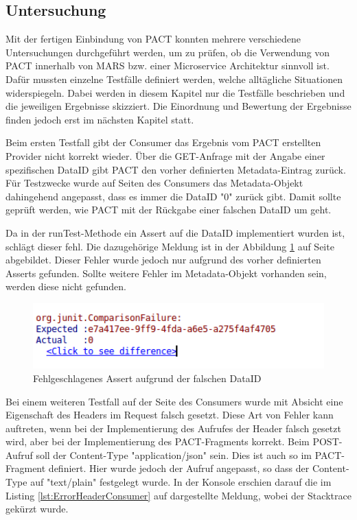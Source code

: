 \documentclass{llncs}
\begin{document}
\subsection{Untersuchung}
Mit der fertigen Einbindung von PACT konnten mehrere verschiedene Untersuchungen durchgeführt werden, um zu prüfen, ob die Verwendung von PACT innerhalb von MARS bzw. einer Microservice Architektur sinnvoll ist. Dafür mussten einzelne Testfälle definiert werden, welche alltägliche Situationen widerspiegeln. Dabei werden in diesem Kapitel nur die Testfälle beschrieben und die jeweiligen Ergebnisse skizziert. Die Einordnung und Bewertung der Ergebnisse finden jedoch erst im nächsten Kapitel statt.

Beim ersten Testfall gibt der Consumer das Ergebnis vom PACT erstellten Provider nicht korrekt wieder. Über die GET-Anfrage mit der Angabe einer spezifischen DataID gibt PACT den vorher definierten Metadata-Eintrag zurück. Für Testzwecke wurde auf Seiten des Consumers das Metadata-Objekt dahingehend angepasst, dass es immer die DataID "0" zurück gibt. Damit sollte geprüft werden, wie PACT mit der Rückgabe einer falschen DataID um geht.

Da in der runTest-Methode ein Assert auf die DataID implementiert wurden ist, schlägt dieser fehl. Die dazugehörige Meldung ist in der Abbildung \ref{fig:ErrorConsumerGet} auf Seite \pageref{fig:ErrorConsumerGet} abgebildet. Dieser Fehler wurde jedoch nur aufgrund des vorher definierten Asserts gefunden. Sollte weitere Fehler im Metadata-Objekt vorhanden sein, werden diese nicht gefunden.

\begin{figure}[htbp]
  \centering
      \includegraphics[width=1\textwidth]{./Images/Error_Consumer-GET}
    \caption{Fehlgeschlagenes Assert aufgrund der falschen DataID}
    \label{fig:ErrorConsumerGet}
\end{figure}

Bei einem weiteren Testfall auf der Seite des Consumers wurde mit Absicht eine Eigenschaft des Headers im Request falsch gesetzt. Diese Art von Fehler kann auftreten, wenn bei der Implementierung des Aufrufes der Header falsch gesetzt wird, aber bei der Implementierung des PACT-Fragments korrekt. Beim POST-Aufruf soll der Content-Type "application/json" sein. Dies ist auch so im PACT-Fragment definiert. Hier wurde jedoch der Aufruf angepasst, so dass der Content-Type auf "text/plain" festgelegt wurde. In der Konsole erschien darauf die im Listing \ref{lst:ErrorHeaderConsumer} auf \pageref{lst:ErrorHeaderConsumer} dargestellte Meldung, wobei der Stacktrace gekürzt wurde.
\end{document}
